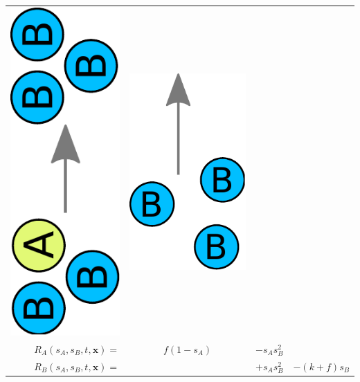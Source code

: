 \documentclass[aspectratio=32]{beamer}
\begin{document}
\begin{frame}
\begin{itemize}
\begin{tabular}{ r c c c }
  \includegraphics[height=\textwidth/12,keepaspectratio,angle=-90,origin=c]{Bilder/gs_reaction.pdf}
  &
  \includegraphics[height=\textwidth/12,keepaspectratio]{Bilder/gs_kill.pdf}
	\\
	\(
		R_A(s_A,s_B,t,\bm{x})=
	\)
	&
	\(
		f(1-s_A)
	\)
	&
	\(
		- s_A s_B^2
	\)
	&
	\\
	\(
		R_B(s_A,s_B,t,\bm{x})=
	\)
	&
	&
	\(
		+ s_A s_B^2
	\)
	&
	\(
		- (k + f) s_B
	\)
	\\
\end{tabular}


\end{itemize}
\end{frame}
\end{document}
